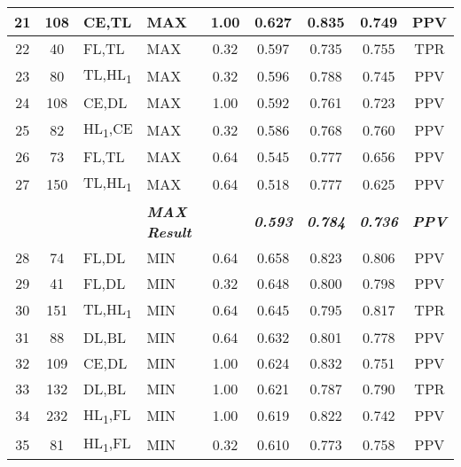 \begin{table}[H]
{\begin{tabular}{ccl|l|c|c|c|c|c|}
  \multicolumn{1}{|c|}{21} &
    \multicolumn{1}{c|}{108} &
    CE,TL &
    MAX &
    1.00 &
    0.627 &
    0.835 &
    0.749 &
    PPV \\ \hline
  \multicolumn{1}{|c|}{22} &
    \multicolumn{1}{c|}{40} &
    FL,TL &
    MAX &
    0.32 &
    0.597 &
    0.735 &
    0.755 &
    TPR \\ \hline
  \multicolumn{1}{|c|}{23} &
    \multicolumn{1}{c|}{80} &
    TL,HL\textsubscript{1} &
    MAX &
    0.32 &
    0.596 &
    0.788 &
    0.745 &
    PPV \\ \hline
  \multicolumn{1}{|c|}{24} &
    \multicolumn{1}{c|}{108} &
    CE,DL &
    MAX &
    1.00 &
    0.592 &
    0.761 &
    0.723 &
    PPV \\ \hline
  \multicolumn{1}{|c|}{25} &
    \multicolumn{1}{c|}{82} &
    HL\textsubscript{1},CE &
    MAX &
    0.32 &
    0.586 &
    0.768 &
    0.760 &
    PPV \\ \hline
  \multicolumn{1}{|c|}{26} &
    \multicolumn{1}{c|}{73} &
    FL,TL &
    MAX &
    0.64 &
    0.545 &
    0.777 &
    0.656 &
    PPV \\ \hline
  \multicolumn{1}{|c|}{27} &
    \multicolumn{1}{c|}{150} &
    TL,HL\textsubscript{1} &
    MAX &
    0.64 &
    0.518 &
    0.777 &
    0.625 &
    PPV \\ \hline
   &
    \textit{\textbf{}} &
     &
    \textit{\textbf{MAX Result}} &
     &
    \textit{\textbf{0.593}} &
    \textit{\textbf{0.784}} &
    \textit{\textbf{0.736}} &
    \textit{\textbf{PPV}} \\ \hline
  \multicolumn{1}{|c|}{28} &
    \multicolumn{1}{c|}{74} &
    FL,DL &
    MIN &
    0.64 &
    0.658 &
    0.823 &
    0.806 &
    PPV \\ \hline
  \multicolumn{1}{|c|}{29} &
    \multicolumn{1}{c|}{41} &
    FL,DL &
    MIN &
    0.32 &
    0.648 &
    0.800 &
    0.798 &
    PPV \\ \hline
  \multicolumn{1}{|c|}{30} &
    \multicolumn{1}{c|}{151} &
    TL,HL\textsubscript{1} &
    MIN &
    0.64 &
    0.645 &
    0.795 &
    0.817 &
    TPR \\ \hline
  \multicolumn{1}{|c|}{31} &
    \multicolumn{1}{c|}{88} &
    DL,BL &
    MIN &
    0.64 &
    0.632 &
    0.801 &
    0.778 &
    PPV \\ \hline
  \multicolumn{1}{|c|}{32} &
    \multicolumn{1}{c|}{109} &
    CE,DL &
    MIN &
    1.00 &
    0.624 &
    0.832 &
    0.751 &
    PPV \\ \hline
  \multicolumn{1}{|c|}{33} &
    \multicolumn{1}{c|}{132} &
    DL,BL &
    MIN &
    1.00 &
    0.621 &
    0.787 &
    0.790 &
    TPR \\ \hline
  \multicolumn{1}{|c|}{34} &
    \multicolumn{1}{c|}{232} &
    HL\textsubscript{1},FL &
    MIN &
    1.00 &
    0.619 &
    0.822 &
    0.742 &
    PPV \\ \hline
  \multicolumn{1}{|c|}{35} &
    \multicolumn{1}{c|}{81} &
    HL\textsubscript{1},FL &
    MIN &
    0.32 &
    0.610 &
    0.773 &
    0.758 &
    PPV \\ \hline
  \end{tabular}%
  }
  \end{table}

